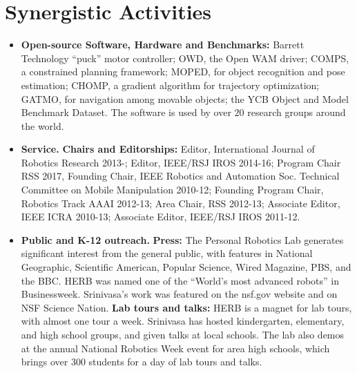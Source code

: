 \documentclass[10pt]{article}
\begin{document}
\section{Synergistic Activities}
\begin{itemize}
\addtolength{\itemsep}{-0.5\baselineskip}
\item \textbf{Open-source Software, Hardware and Benchmarks:}
Barrett Technology ``puck'' motor controller; OWD, the Open WAM driver; COMPS, a constrained planning framework; MOPED, for object recognition and pose estimation; CHOMP, a gradient algorithm for trajectory optimization; GATMO, for navigation among movable objects; the YCB Object and Model Benchmark Dataset. The software is used by over $20$ research groups around the world. 
\item \textbf{Service.} \textbf{Chairs and Editorships:}
Editor, International Journal of Robotics Research 2013-;
Editor, IEEE/RSJ IROS 2014-16;
Program Chair RSS 2017,
Founding Chair, IEEE Robotics and Automation Soc. Technical Committee on Mobile Manipulation 2010-12;
Founding Program Chair, Robotics Track AAAI 2012-13;
Area Chair, RSS 2012-13;
Associate Editor, IEEE ICRA 2010-13;
Associate Editor, IEEE/RSJ IROS 2011-12.
\item  \textbf{Public and K-12 outreach.} \textbf{Press:}
The Personal Robotics Lab generates significant interest from the general public, with features in National Geographic, Scientific American, Popular Science, Wired Magazine, PBS, and the BBC. HERB was named one of the ``World's most advanced robots'' in Businessweek. Srinivasa's work was featured on the nsf.gov website and on NSF Science Nation.    
 \textbf{Lab tours and talks:}
  HERB is a magnet for lab tours, with almost one tour a week. Srinivasa has hosted kindergarten, elementary, and high school groups, and given talks at local schools. The lab also demos at the annual National Robotics Week event for area high schools, which brings over 300 students for a day of lab tours and talks.
\end{itemize}

\newpage
 

\end{document}
